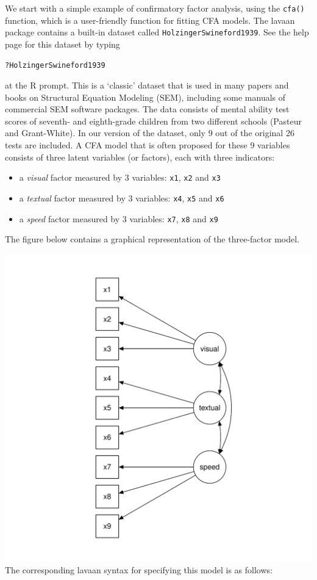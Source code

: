 We start with a simple example of confirmatory factor analysis, using
the \texttt{cfa()} function, which is a user-friendly function for
fitting CFA models. The lavaan package contains a built-in dataset
called \texttt{HolzingerSwineford1939}. See the help page for this
dataset by typing

\begin{verbatim}
?HolzingerSwineford1939
\end{verbatim}

at the R prompt. This is a `classic' dataset that is used in many papers
and books on Structural Equation Modeling (SEM), including some manuals
of commercial SEM software packages. The data consists of mental ability
test scores of seventh- and eighth-grade children from two different
schools (Pasteur and Grant-White). In our version of the dataset, only 9
out of the original 26 tests are included. A CFA model that is often
proposed for these 9 variables consists of three latent variables (or
factors), each with three indicators:

\begin{itemize}
\tightlist
\item
  a \emph{visual} factor measured by 3 variables: \texttt{x1},
  \texttt{x2} and \texttt{x3}
\item
  a \emph{textual} factor measured by 3 variables: \texttt{x4},
  \texttt{x5} and \texttt{x6}
\item
  a \emph{speed} factor measured by 3 variables: \texttt{x7},
  \texttt{x8} and \texttt{x9}
\end{itemize}

The figure below contains a graphical representation of the three-factor
model.

\includegraphics{figure/cfa-1.pdf} The corresponding lavaan syntax for
specifying this model is as follows:

